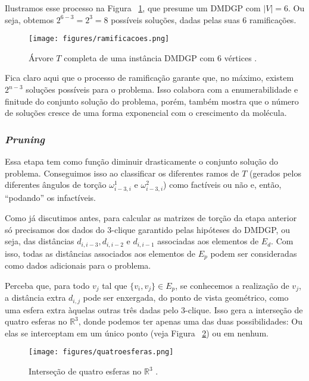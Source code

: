 Ilustramos esse processo na Figura ~\ref{fig:ramificacoes}, que presume um DMDGP com $|V| = 6$. Ou seja, obtemos $2^{6-3} = 2^3 = 8$ possíveis soluções, dadas pelas suas 6 ramificações.

\begin{figure}[H]
	\begin{center}
		\texttt{[image: figures/ramificacoes.png]}
	\end{center}
	\caption{Árvore $T$ completa de uma instância DMDGP com 6 vértices \cite{fidalgotese}.}
	\label{fig:ramificacoes}
\end{figure}

Fica claro aqui que o processo de ramificação garante que, no máximo, existem $2^{n-3}$ soluções possíveis para o problema. Isso colabora com a enumerabilidade e finitude do conjunto solução do problema, porém, também mostra que o número de soluções cresce de uma forma exponencial com o crescimento da molécula.

\subsubsection*{\textit{Pruning}}
Essa etapa tem como função diminuir drasticamente o conjunto solução do problema. Conseguimos isso ao classificar os diferentes ramos de $T$ (gerados pelos diferentes ângulos de torção $\omega_{i-3,i}^1$ e $\omega_{i-3,i}^2$) como factíveis ou não e, então, ``podando'' os infactíveis.  

Como já discutimos antes, para calcular as matrizes de torção da etapa anterior só precisamos dos dados do 3-clique garantido pelas hipóteses do DMDGP, ou seja, das distâncias $d_{i,i-3}, d_{i,i-2}$ e $d_{i,i-1}$ associadas aos elementos de $E_d$. Com isso, todas as distâncias associados aos elementos de $E_p$ podem ser consideradas como dados adicionais para o problema. 

Perceba que, para todo $v_j$ tal que $\{v_i,v_j\} \in E_p$, se conhecemos a realização de $v_j$, a distância extra $d_{i,j}$ pode ser enxergada, do ponto de vista geométrico, como uma esfera extra àquelas outras três dadas pelo 3-clique. Isso gera a interseção de quatro esferas no $\mathbb{R}^3$, donde podemos ter apenas uma das duas possibilidades: Ou elas se interceptam em um único ponto (veja Figura ~\ref{fig:quatroesferas}) ou em nenhum. 

\begin{figure}[H]
	\begin{center}
		\texttt{[image: figures/quatroesferas.png]}
	\end{center}
	\caption{Interseção de quatro esferas no $\mathbb{R}^3$ \cite{carlileBook31Coloquio}.}
	\label{fig:quatroesferas}
\end{figure}

